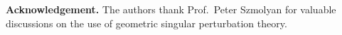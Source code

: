 \documentclass[usletter,11pt]{article}
\theoremstyle{remark}
\begin{document}
%

\bigskip
\noindent
{\bf Acknowledgement.}
The authors thank {\sc Prof.~Peter Szmolyan} for valuable discussions on the use of geometric singular perturbation theory.
\end{document}
